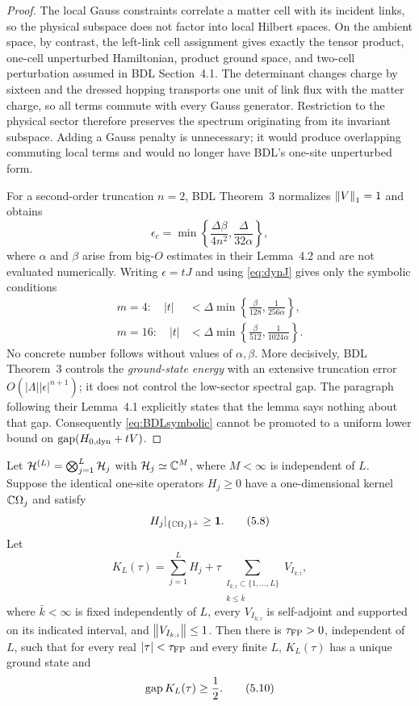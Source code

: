 \begin{proof}
The local Gauss constraints correlate a matter cell with its incident
links, so the physical subspace does not factor into local Hilbert spaces.
On the ambient space, by contrast, the left-link cell assignment gives
exactly the tensor product, one-cell unperturbed Hamiltonian, product
ground space, and two-cell perturbation assumed in BDL Section~4.1.
The determinant changes charge by sixteen and the dressed hopping
transports one unit of link flux with the matter charge, so all terms
commute with every Gauss generator.  Restriction to the physical sector
therefore preserves the spectrum originating from its invariant
subspace.  Adding a Gauss penalty is unnecessary; it would produce
overlapping commuting local terms and would no longer have BDL's
one-site unperturbed form.

For a second-order truncation $n=2$, BDL Theorem~3 normalizes
$\left\lVert V\right\rVert_1=1$ and obtains
\[
 \epsilon_c
 =\min\left\{\frac{\Delta\beta}{4n^2},
              \frac{\Delta}{32\alpha}\right\},
\tag{5.6}\label{eq:BDLeps}
\]
where $\alpha$ and $\beta$ arise from big-$O$ estimates in their
Lemma~4.2 and are not evaluated numerically.  Writing
$\epsilon=tJ$ and using \eqref{eq:dynJ} gives only the symbolic
conditions
\[
\begin{aligned}
 m=4:\quad
 |t|&<\Delta\min\left\{\frac{\beta}{128},
                  \frac1{256\alpha}\right\},\\
 m=16:\quad
 |t|&<\Delta\min\left\{\frac{\beta}{512},
                  \frac1{1024\alpha}\right\}.
\end{aligned}
\tag{5.7}\label{eq:BDLsymbolic}
\]
No concrete number follows without values of $\alpha,\beta$.
More decisively, BDL Theorem~3 controls the \emph{ground-state energy}
with an extensive truncation error
$O(|\Lambda||\epsilon|^{n+1})$; it does not control the low-sector
spectral gap.  The paragraph following their Lemma~4.1 explicitly states
that the lemma says nothing about that gap.  Consequently
\eqref{eq:BDLsymbolic} cannot be promoted to a uniform lower bound on
$\operatorname{gap}(H_{0,\mathrm{dyn}}+tV)$.
\end{proof}

\begin{theorem}
\label{thm:FP}
Let
$\mathcal H^{(L)}=\bigotimes_{j=1}^{L}\mathcal H_j$ with
$\mathcal H_j\simeq\mathbb C^M$, where $M<\infty$ is independent of $L$.
Suppose the identical one-site operators $H_j\geq0$ have a
one-dimensional kernel $\mathbb C\Omega_j$ and satisfy
\[
 H_j|_{\{\mathbb C\Omega_j\}^{\perp}}\geq\mathbf 1.
\tag{5.8}\label{eq:FPlocal}
\]
Let
\[
 K_L(\tau)=\sum_{j=1}^{L}H_j+
 \tau\sum_{\substack{I_{k;i}\subset\{1,\ldots,L\}\\
                     k\leq\bar k}}V_{I_{k;i}},
\tag{5.9}\label{eq:FPK}
\]
where $\bar k<\infty$ is fixed independently of $L$, every
$V_{I_{k;i}}$ is self-adjoint and supported on its indicated interval,
and $\left\lVert V_{I_{k;i}}\right\rVert\leq1$.  Then there is
$\tau_{\rm FP}>0$, independent of $L$, such that for every real
$|\tau|<\tau_{\rm FP}$ and every finite $L$, $K_L(\tau)$ has a unique
ground state and
\[
 \operatorname{gap} K_L(\tau)\geq\frac12.
\tag{5.10}\label{eq:FPgap}
\]
\end{theorem}

